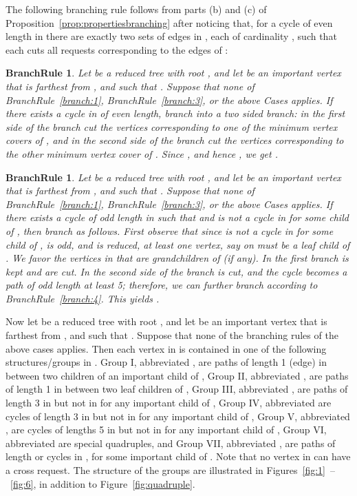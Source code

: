 \documentclass[11pt]{article}
\newtheorem{branchrule}[theorem]{BranchRule}
\begin{document}
The following branching rule follows from parts (b) and (c) of Proposition~\ref{prop:propertiesbranching} after noticing that, for a cycle of even length in  there are exactly two sets of edges in , each of cardinality , such that each cuts all requests corresponding to the edges of :

\begin{branchrule}\label{branch:5}
Let  be a reduced tree with root , and let  be an important vertex that is farthest from , and such that . Suppose that none of BranchRule~\ref{branch:1}, BranchRule~\ref{branch:3}, or the above Cases applies. If there exists a cycle  in  of even length, branch into a two sided branch: in the first side of the branch cut the vertices corresponding to one of the minimum vertex covers of , and in the second  side of the branch cut the vertices corresponding to the other minimum vertex cover of .  Since , and hence , we get .
\end{branchrule}


\begin{branchrule}\label{branch:5}
Let  be a reduced tree with root , and let  be an important vertex that is farthest from , and such that . Suppose that none of BranchRule~\ref{branch:1}, BranchRule~\ref{branch:3}, or the above Cases applies. If there exists a cycle of odd length  in  such that  and  is not a cycle in  for some child  of , then branch as follows. First observe that since  is not a cycle in  for some child  of ,  is odd, and  is reduced, at least one vertex, say  on  must be a leaf child of . We favor the vertices in  that are grandchildren of  (if any). In the first branch  is kept and  are cut. In the second side of the branch  is cut, and the cycle becomes a path of odd length at least 5; therefore, we can further branch according to BranchRule~\ref{branch:4}. This yields .
\end{branchrule}


Now let  be a reduced tree with root , and let  be an important vertex that is farthest from , and such that . Suppose that none of the branching rules of the above cases applies. Then each vertex in  is contained in one of the following structures/groups in . Group I, abbreviated , are paths of length 1 (edge) in  between two children of an important child of , Group II, abbreviated , are paths of length 1 in  between two leaf children of , Group III, abbreviated , are paths of length 3 in  but not in  for any important child of , Group IV, abbreviated  are cycles of length 3 in  but not in  for any important child of , Group V, abbreviated , are cycles of lengths 5 in   but not in  for any important child of , Group VI, abbreviated  are special quadruples, and Group VII, abbreviated , are paths of length  or cycles in , for some important child  of . Note that no vertex in  can have a cross request. The structure of the groups are illustrated in Figures~\ref{fig:1}~--~\ref{fig:6}, in addition to Figure~\ref{fig:quadruple}.
\end{document}
